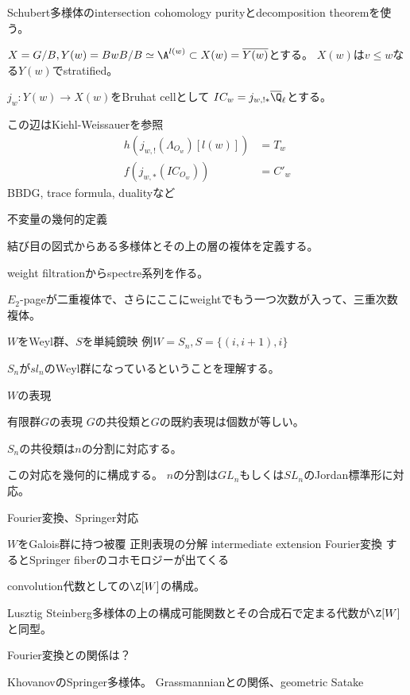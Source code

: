 \documentclass[dvipdfmx]{beamer}
\begin{document}
\begin{frame}{Schubert多様体のintersection cohomology}
purityとdecomposition theoremを使う。

$X=G/B, Y(w)=BwB/B\simeq \A^{l(w)}\subset X(w)=\overline{Y(w)}$とする。
$X(w)$は$v\leq w$なる$Y(w)$でstratified。

$j_w:Y(w) \to X(w)$をBruhat cellとして
$IC_w=j_{w,!*}\overline{\Q}_\ell$とする。

この辺はKiehl-Weissauerを参照
\begin{align*}
h(j_{w,!}(\Lambda_{O_w})[l(w)])&=T_w\\
f(j_{w,*}(IC_{O_w}))&=C'_w
\end{align*}
BBDG, trace formula, dualityなど
\end{frame}

\begin{frame}
不変量の幾何的定義

結び目の図式からある多様体とその上の層の複体を定義する。

weight filtrationからspectre系列を作る。

$E_2$-pageが二重複体で、さらにここにweightでもう一つ次数が入って、三重次数複体。
\end{frame}

\begin{frame}
$W$をWeyl群、$S$を単純鏡映
例$W=S_n, S=\{(i,i+1),i\}$

$S_n$が$sl_n$のWeyl群になっているということを理解する。

$W$の表現

有限群$G$の表現
$G$の共役類と$G$の既約表現は個数が等しい。

$S_n$の共役類は$n$の分割に対応する。

この対応を幾何的に構成する。
$n$の分割は$GL_n$もしくは$SL_n$のJordan標準形に対応。
\end{frame}

\begin{frame}
Fourier変換、Springer対応

$W$をGalois群に持つ被覆
正則表現の分解
intermediate extension
Fourier変換
するとSpringer fiberのコホモロジーが出てくる
\end{frame}

\begin{frame}
convolution代数としての$\Z[W]$の構成。

Lusztig
Steinberg多様体の上の構成可能関数とその合成石で定まる代数が$\Z[W]$と同型。

Fourier変換との関係は？
\end{frame}

\begin{frame}
KhovanovのSpringer多様体。
Grassmannianとの関係、geometric Satake
\end{frame}
\end{document}
